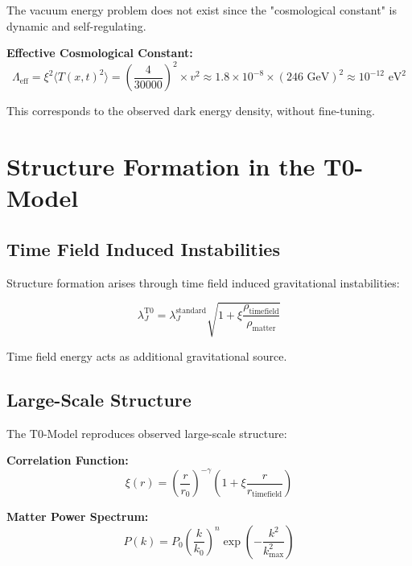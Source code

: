 \documentclass[12pt,a4paper]{report}
\newcommand{\Tfield}{T(x,t)}  %
\newcommand{\xipar}{\xi}      %
\begin{document}
	The vacuum energy problem does not exist since the "cosmological constant" is dynamic and self-regulating.
	
	\textbf{Effective Cosmological Constant:}
	\begin{equation}
		\Lambda_{\text{eff}} = \xipar^2 \langle \Tfield^2 \rangle = \left(\frac{4}{30000}\right)^2 \times v^2 \approx 1.8 \times 10^{-8} \times (246 \text{ GeV})^2 \approx 10^{-12} \text{ eV}^2
	\end{equation}
	
	This corresponds to the observed dark energy density, without fine-tuning.
	
	\section{Structure Formation in the T0-Model}\label{sec:structure_formation}
	
	\subsection{Time Field Induced Instabilities}\label{subsec:timefield_instabilities}
	
	Structure formation arises through time field induced gravitational instabilities:
	
	\begin{equation}\label{eq:jeans_instability_t0}
		\lambda_J^{\text{T0}} = \lambda_J^{\text{standard}} \sqrt{1 + \xipar \frac{\rho_{\text{timefield}}}{\rho_{\text{matter}}}}
	\end{equation}
	
	Time field energy acts as additional gravitational source.
	
	\subsection{Large-Scale Structure}\label{subsec:large_scale_structure}
	
	The T0-Model reproduces observed large-scale structure:
	
	\textbf{Correlation Function:}
	\begin{equation}
		\xi(r) = \left(\frac{r}{r_0}\right)^{-\gamma} \left(1 + \xipar \frac{r}{r_{\text{timefield}}}\right)
	\end{equation}
	
	\textbf{Matter Power Spectrum:}
	\begin{equation}
		P(k) = P_0 \left(\frac{k}{k_0}\right)^n \exp\left(-\frac{k^2}{k_{\text{max}}^2}\right)
	\end{equation}
	
\end{document}
